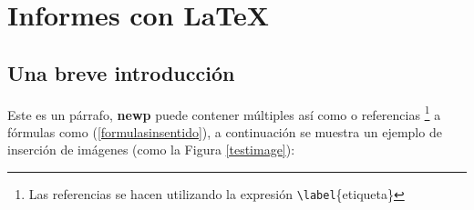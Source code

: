 %
%

\section{Informes con \LaTeX}

	\subsection{Una breve introducción}
	
		\lipsum[4]
		
		
		Este es un párrafo, \textbf{newp} puede contener múltiples  así como  o referencias \footnote{ Las referencias se hacen utilizando la expresión \texttt{\textbackslash label}\{etiqueta\}} a fórmulas como (\ref{formulasinsentido}), a continuación se muestra un ejemplo de inserción de imágenes (como la Figura \ref{testimage}):
		
